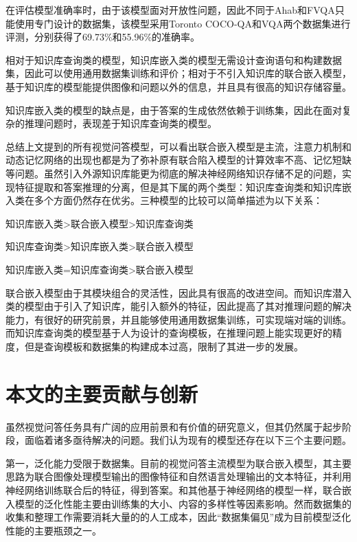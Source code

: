 在评估模型准确率时，由于该模型面对开放性问题，因此不同于Ahab和FVQA只能使用专门设计的数据集，该模型采用Toronto COCO-QA和VQA两个数据集进行评测，分别获得了69.73\%和55.96\%的准确率。

相对于知识库查询类的模型，知识库嵌入类的模型无需设计查询语句和构建数据集，因此可以使用通用数据集训练和评价；相对于不引入知识库的联合嵌入模型，基于知识库的模型能提供图像和问题以外的信息，并且具有很高的知识存储容量。

知识库嵌入类的模型的缺点是，由于答案的生成依然依赖于训练集，因此在面对复杂的推理问题时，表现差于知识库查询类的模型。

总结上文提到的所有视觉问答模型，可以看出联合嵌入模型是主流，注意力机制和动态记忆网络的出现也都是为了弥补原有联合陷入模型的计算效率不高、记忆短缺等问题。虽然引入外源知识库能更为彻底的解决神经网络知识存储不足的问题，实现特征提取和答案推理的分离，但是其下属的两个类型：知识库查询类和知识库嵌入类在多个方面仍然存在优劣。三种模型的比较可以简单描述为以下关系：
\begin{description}[labelindent=2em, leftmargin=6em, style=sameline]
\item [解决识别类问题：]知识库嵌入类>联合嵌入模型>知识库查询类
\item [解决推理类问题：]知识库查询类>知识库嵌入类>联合嵌入模型
\item [模型迁移能力：]知识库嵌入类=知识库查询类>联合嵌入模型
\end{description}

联合嵌入模型由于其模块组合的灵活性，因此具有很高的改进空间。而知识库潜入类的模型由于引入了知识库，能引入额外的特征，因此提高了其对推理问题的解决能力，有很好的研究前景，并且能够使用通用数据集训练，可实现端对端的训练。而知识库查询类的模型基于人为设计的查询模板，在推理问题上能实现更好的精度，但是查询模板和数据集的构建成本过高，限制了其进一步的发展。

\section{本文的主要贡献与创新}
虽然视觉问答任务具有广阔的应用前景和有价值的研究意义，但其仍然属于起步阶段，面临着诸多亟待解决的问题。我们认为现有的模型还存在以下三个主要问题。

第一，泛化能力受限于数据集。目前的视觉问答主流模型为联合嵌入模型，其主要思路为联合图像处理模型输出的图像特征和自然语言处理输出的文本特征，并利用神经网络训练联合后的特征，得到答案。和其他基于神经网络的模型一样，联合嵌入模型的泛化性能主要由训练集的大小、内容的多样性等因素影响。然而数据集的收集和整理工作需要消耗大量的的人工成本，因此“数据集偏见”成为目前模型泛化性能的主要瓶颈之一。

